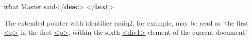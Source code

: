 \begin{shaded}
\hspace*{1em}\hspace*{1em}\hspace*{1em}\hspace*{1em}\hspace*{1em}what Master said{</\textbf{desc}>}\mbox{}\newline 
\hspace*{1em}\hspace*{1em}\hspace*{1em}\hspace*{1em}\mbox{}\newline 
\hspace*{1em}\hspace*{1em}\hspace*{1em}\mbox{}\newline 
\hspace*{1em}\hspace*{1em}\mbox{}\newline 
\hspace*{1em}\mbox{}\newline 
{}\mbox{}\newline 
{</\textbf{text}>}\end{shaded}\egroup\par \par
The extended pointer with identifier rzuiq2, for example, may be read as ‘the first \hyperref[TEI.q]{<q>} in the first \hyperref[TEI.p]{<p>}, within the sixth \hyperref[TEI.div1]{<div1>} element of the current document.’
